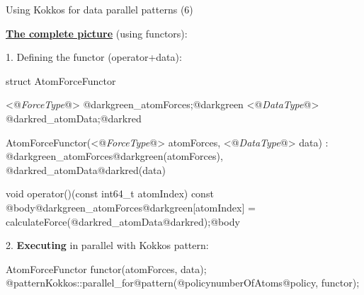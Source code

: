 \begin{frame}[fragile]{Using Kokkos for data parallel patterns (6)}

  \textbf{\ul{The complete picture}} (using functors):

  \vspace{8pt}

  1.  Defining the functor (operator+data):

  \vspace{0pt}

  \begin{code}[keywords={}, frame=single]
struct AtomForceFunctor {
  <@\emph{ForceType}@> @darkgreen_atomForces;@darkgreen
  <@\emph{DataType}@> @darkred_atomData;@darkred

  AtomForceFunctor(<@\emph{ForceType}@> atomForces, <@\emph{DataType}@> data) :
    @darkgreen_atomForces@darkgreen(atomForces), @darkred_atomData@darkred(data) {}

  void operator()(const int64_t atomIndex) const {
    @body@darkgreen_atomForces@darkgreen[atomIndex] = calculateForce(@darkred_atomData@darkred);@body
  }
}
  \end{code}

  \vspace{5pt}

  2.  \textbf{Executing} in parallel with Kokkos pattern:

  \vspace{-4pt}

  \begin{code}
AtomForceFunctor functor(atomForces, data);
@patternKokkos::parallel_for@pattern(@policynumberOfAtoms@policy, functor);
  \end{code}

\end{frame}


